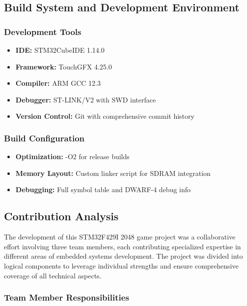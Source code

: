 \documentclass[12pt,a4paper]{article}
\begin{document}
\subsection{Build System and Development Environment}

\subsubsection{Development Tools}
\begin{itemize}[leftmargin=*]
    \item \textbf{IDE:} STM32CubeIDE 1.14.0
    \item \textbf{Framework:} TouchGFX 4.25.0
    \item \textbf{Compiler:} ARM GCC 12.3
    \item \textbf{Debugger:} ST-LINK/V2 with SWD interface
    \item \textbf{Version Control:} Git with comprehensive commit history
\end{itemize}

\subsubsection{Build Configuration}
\begin{itemize}[leftmargin=*]
    \item \textbf{Optimization:} -O2 for release builds
    \item \textbf{Memory Layout:} Custom linker script for SDRAM integration
    \item \textbf{Debugging:} Full symbol table and DWARF-4 debug info
\end{itemize}

\subsection{Contribution Analysis}

The development of this STM32F429I 2048 game project was a collaborative effort involving three team members, each contributing specialized expertise in different areas of embedded systems development. The project was divided into logical components to leverage individual strengths and ensure comprehensive coverage of all technical aspects.

\subsubsection{Team Member Responsibilities}
\end{document}
